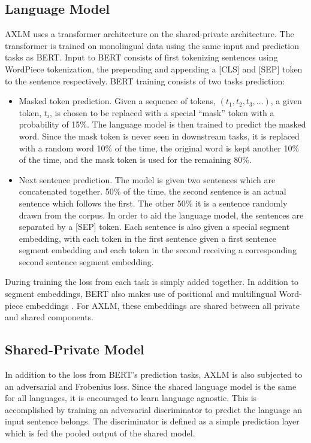 \documentclass[12pt,letterpaper]{article}
\begin{document}
\begin{multicols}{2}

\subsection{Language Model}
AXLM uses a transformer architecture on the shared-private architecture.  The transformer is trained on monolingual data using the same input and prediction tasks as BERT.  Input to BERT consists of first tokenizing sentences using WordPiece tokenization, the prepending and appending a [CLS] and [SEP] token to the sentence respectively.  BERT training consists of two tasks prediction:

\begin{itemize}
	\item Masked token prediction.  Given a sequence of tokens, $(t_1, t_2, t_3, \dots)$, a given token, $t_i$, is chosen to be replaced with a special ``mask'' token with a probability of 15\%.  The language model is then trained to predict the masked word.  Since the mask token is never seen in downstream tasks, it is replaced with a random word 10\% of the time, the original word is kept another 10\% of the time, and the mask token is used for the remaining 80\%.

	\item Next sentence prediction.  The model is given two sentences which are concatenated together.  50\% of the time, the second sentence is an actual sentence which follows the first.  The other 50\% it is a sentence randomly drawn from the corpus.  In order to aid the language model, the sentences are separated by a [SEP] token.  Each sentence is also given a special segment embedding, with each token in the first sentence given a first sentence segment embedding and each token in the second receiving a corresponding second sentence segment embedding.
\end{itemize}

During training the loss from each task is simply added together.  In addition to segment embeddings, BERT also makes use of positional and multilingual Word-piece embeddings \cite{}.  For AXLM, these embeddings are shared between all private and shared components.


\subsection{Shared-Private Model}
In addition to the loss from BERT's prediction tasks, AXLM is also subjected to an adversarial and Frobenius loss.  Since the shared language model is the same for all languages, it is encouraged to learn language agnostic.  This is accomplished by training an adversarial discriminator to predict the language an input sentence belongs.  The discriminator is defined as a simple prediction layer which is fed the pooled output of the shared model.


\end{multicols}
\end{document}
